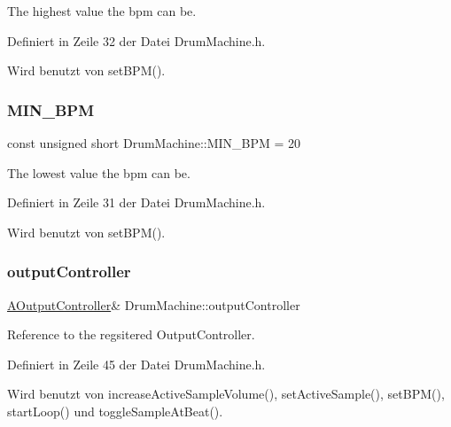 The highest value the bpm can be. 



Definiert in Zeile 32 der Datei Drum\+Machine.\+h.



Wird benutzt von set\+B\+P\+M().

\mbox{\label{class_drum_machine_a221c0cd8b5cf3f2342f57ad539d3628a}} 
\subsubsection{\texorpdfstring{M\+I\+N\+\_\+\+B\+PM}{MIN\_BPM}}
{\footnotesize\ttfamily const unsigned short Drum\+Machine\+::\+M\+I\+N\+\_\+\+B\+PM = 20\hspace{0.3cm}{\ttfamily [private]}}



The lowest value the bpm can be. 



Definiert in Zeile 31 der Datei Drum\+Machine.\+h.



Wird benutzt von set\+B\+P\+M().

\mbox{\label{class_drum_machine_a4a5b4d6cc6e4a3ce2c2893e52fd0e951}} 
\subsubsection{\texorpdfstring{output\+Controller}{outputController}}
{\footnotesize\ttfamily \hyperlink{class_a_output_controller}{A\+Output\+Controller}\& Drum\+Machine\+::output\+Controller\hspace{0.3cm}{\ttfamily [private]}}



Reference to the regsitered Output\+Controller. 



Definiert in Zeile 45 der Datei Drum\+Machine.\+h.



Wird benutzt von increase\+Active\+Sample\+Volume(), set\+Active\+Sample(), set\+B\+P\+M(), start\+Loop() und toggle\+Sample\+At\+Beat().

